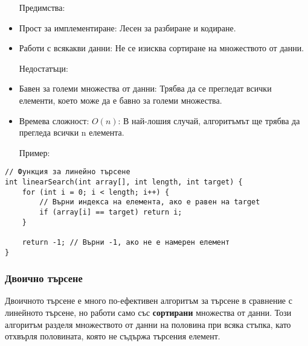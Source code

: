 \documentclass[oneside]{book}
\begin{document}
\begin{itemize}\item[Предимства:]\end{itemize}
\begin{itemize}
    \item Прост за имплементиране: Лесен за разбиране и кодиране.
    \item Работи с всякакви данни: Не се изисква сортиране на множеството от данни.
\end{itemize}

\begin{itemize}\item[Недостатъци:]\end{itemize}
\begin{itemize}
    \item Бавен за големи множества от данни: Трябва да се прегледат всички елементи, което може да е бавно за големи множества.
    \item Времева сложност: $O(n)$: В най-лошия случай, алгоритъмът ще трябва да прегледа всички n елемента.
\end{itemize}

\pagebreak
\begin{itemize}\item[Пример:]\end{itemize}
\begin{mdframed}\begin{lstlisting}
// Функция за линейно търсене
int linearSearch(int array[], int length, int target) {
    for (int i = 0; i < length; i++) {
        // Върни индекса на елемента, ако е равен на target
        if (array[i] == target) return i;
    }
    
    return -1; // Върни -1, ако не е намерен елемент
}
\end{lstlisting}\end{mdframed}

\subsubsection{Двоично търсене}
Двоичното търсене е много по-ефективен алгоритъм за търсене в сравнение с линейното търсене, но работи само със \textbf{сортирани} множества от данни. Този алгоритъм разделя множеството от данни на половина при всяка стъпка, като отхвърля половината, която не съдържа търсения елемент.
\end{document}

